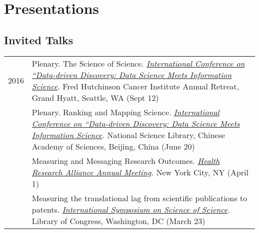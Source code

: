 \documentclass[11pt]{article}
\begin{document}
\vspace{5mm}


\section*{\textbf{Presentations}}

\setlength{\extrarowheight}{8pt}

\subsection*{\textbf{Invited Talks}}

\begin{longtable}{p{0.5in}|p{5.5in}}
  
  2016	
  		& Plenary. The Science of Science. \textit{\href{http://159.226.100.150:8084/cjlis/EN/column/item157.shtml}{International Conference on “Data-driven Discovery: Data Science Meets Information Science}.} Fred Hutchinson Cancer Institute Annual Retreat, Grand Hyatt, Seattle, WA (Sept 12) \\

      & Plenary. Ranking and Mapping Science. \textit{\href{http://159.226.100.150:8084/cjlis/EN/column/item157.shtml}{International Conference on “Data-driven Discovery: Data Science Meets Information Science}.} National Science Library, Chinese Academy of Sciences, Beijing, China (June 20) \\




  		& Measuring and Messaging Research Outcomes. \textit{\href{https://www.healthra.org}{Health Research Alliance Annual Meeting}.} New York City, NY (April 1) \\

  		& Measuring the translational lag from scientific publications to patents. \textit{\href{http://icss.ist.psu.edu}{International Symposium on Science of Science}.} Library of Congress, Washington, DC (March 23) \\


\end{longtable}
\end{document}
